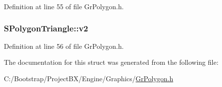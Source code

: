 Definition at line 55 of file GrPolygon.h.\hypertarget{struct_s_polygon_triangle_be81bfc0cd18a6e7e6637073112c6793}{
\subsubsection[{v2}]{ {\bf SPolygonTriangle::v2}}}
\label{struct_s_polygon_triangle_be81bfc0cd18a6e7e6637073112c6793}




Definition at line 56 of file GrPolygon.h.

The documentation for this struct was generated from the following file:\begin{CompactItemize}
\item 
C:/Bootstrap/ProjectBX/Engine/Graphics/\hyperlink{_gr_polygon_8h}{GrPolygon.h}\end{CompactItemize}
